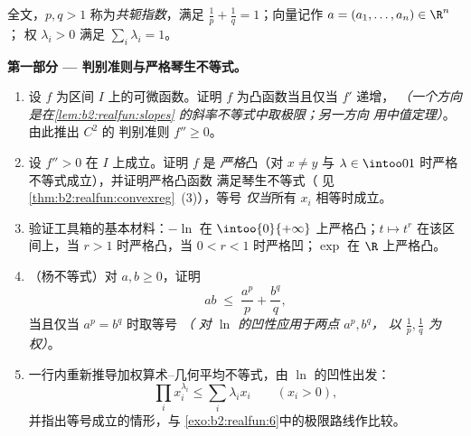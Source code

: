 \begin{problem}
\label{pb:b2:realfun:1}
全文，$p, q > 1$ 称为\emph{共轭指数}，满足 $\frac1p +
\frac1q = 1$；向量记作 $a = (a_1, \dots, a_n) \in \R^n$；
权 $\lambda_i > 0$ 满足 $\sum_i\lambda_i = 1$。

\medskip
\noindent\textbf{第一部分 --- 判别准则与严格琴生不等式。}
\begin{enumerate}
  \item 设 $f$ 为区间 $I$ 上的可微函数。证明
        $f$ 为凸函数当且仅当 $f'$ 递增，
        \emph{（一个方向是在\cref{lem:b2:realfun:slopes}
        的斜率不等式中取极限；另一方向
        用中值定理）}。由此推出 $C^2$ 的
        判别准则 $f'' \geq 0$。
  \item 设 $f''> 0$ 在 $I$ 上成立。证明 $f$ 是
        \emph{严格}凸（对 $x \neq y$
        与 $\lambda \in \intoo01$ 时严格不等式成立），并证明严格凸函数
        满足琴生不等式（
        见\cref{thm:b2:realfun:convexreg}~(3)），等号
        \emph{仅当}所有 $x_i$ 相等时成立。
  \item 验证工具箱的基本材料：$-\ln$ 在
        $\intoo{0}{+\infty}$ 上严格凸；$t \mapsto t^r$ 在该区间上，当 $r > 1$
        时严格凸，当 $0 < r < 1$ 时严格凹；$\exp$ 在 $\R$
        上严格凸。
  \item （杨不等式）对 $a, b \geq 0$，证明
        \[
        ab \;\leq\; \frac{a^p}{p} + \frac{b^q}{q},
        \]
        当且仅当 $a^p = b^q$ 时取等号 \emph{（
        对 $\ln$ 的凹性应用于两点 $a^p, b^q$，
        以 $\frac1p, \frac1q$ 为权）}。
  \item 一行内重新推导加权算术–几何平均不等式，由
        $\ln$ 的凹性出发：
        \[
        \prod_i x_i^{\lambda_i} \leq \sum_i\lambda_ix_i \qquad
        (x_i > 0),
        \]
        并指出等号成立的情形，与
        \cref{exo:b2:realfun:6}中的极限路线作比较。
\end{enumerate}


\end{problem}

